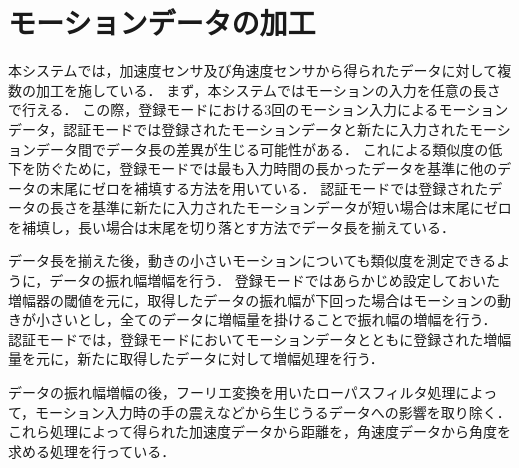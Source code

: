 \section{モーションデータの加工}
本システムでは，加速度センサ及び角速度センサから得られたデータに対して複数の加工を施している．
まず，本システムではモーションの入力を任意の長さで行える．
この際，登録モードにおける3回のモーション入力によるモーションデータ，認証モードでは登録されたモーションデータと新たに入力されたモーションデータ間でデータ長の差異が生じる可能性がある．
これによる類似度の低下を防ぐために，登録モードでは最も入力時間の長かったデータを基準に他のデータの末尾にゼロを補填する方法を用いている．
認証モードでは登録されたデータの長さを基準に新たに入力されたモーションデータが短い場合は末尾にゼロを補填し，長い場合は末尾を切り落とす方法でデータ長を揃えている．

データ長を揃えた後，動きの小さいモーションについても類似度を測定できるように，データの振れ幅増幅を行う．
登録モードではあらかじめ設定しておいた増幅器の閾値を元に，取得したデータの振れ幅が下回った場合はモーションの動きが小さいとし，全てのデータに増幅量を掛けることで振れ幅の増幅を行う．
認証モードでは，登録モードにおいてモーションデータとともに登録された増幅量を元に，新たに取得したデータに対して増幅処理を行う．

データの振れ幅増幅の後，フーリエ変換を用いたローパスフィルタ処理によって，モーション入力時の手の震えなどから生じうるデータへの影響を取り除く．
これら処理によって得られた加速度データから距離を，角速度データから角度を求める処理を行っている．

